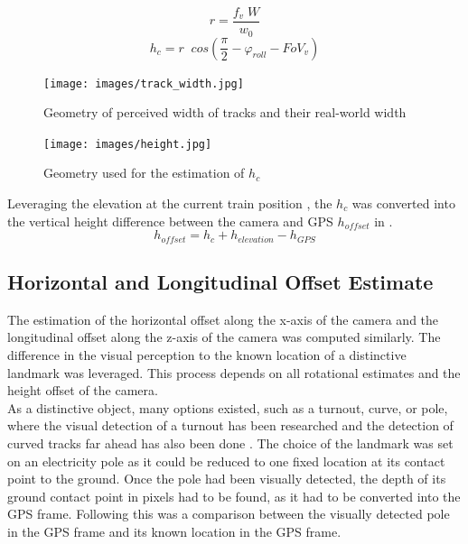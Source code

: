 \begin{equation}
r = \frac{f_v\;  W}{w_0} 
\label{eq:r}
\end{equation}
\begin{equation}
 h_c = r  \; \; cos(\frac{\pi}{2}- \varphi_{roll} - FoV_v)
 \label{eq:h_c}
\end{equation}

\begin{figure}[h!]
   \centering
   \texttt{[image: images/track\_width.jpg]}
   \caption{Geometry of perceived width of tracks and their real-world width}
   \label{pics:width_tracks}
\end{figure}

\begin{figure}[h!]
   \centering
   \texttt{[image: images/height.jpg]}
   \caption{Geometry used for the estimation of $h_{c}$ \citep{ross2010vision}}
   \label{pics:y_pos}
\end{figure}

Leveraging the elevation at the current train position \citep{digitales}, the $h_c$ was converted into the vertical height difference between the camera and GPS $h_{offset}$ in .\\
\begin{equation}
h_{offset} = h_c + h_{elevation} - h_{GPS}
\label{eq:y_pos}
\end{equation}
\newpage


\subsection{Horizontal and Longitudinal Offset Estimate}
The estimation of the horizontal offset along the x-axis of the camera and the longitudinal offset along the z-axis of the camera was computed similarly. The difference in the visual perception to the known location of a distinctive landmark was leveraged. This process depends on all rotational estimates and the height offset of the camera.\\

As a distinctive object, many options existed, such as a turnout, curve, or pole, where the visual detection of a turnout has been researched \citep{qi2013efficient} \citep{ross2010vision} \citep{ross2012track} and the detection of curved tracks far ahead has also been done \citep{nassu2011rail}. The choice of the landmark was set on an electricity pole as it could be reduced to one fixed location at its contact point to the ground. Once the pole had been visually detected, the depth of its ground contact point in pixels had to be found, as it had to be converted into the GPS frame. Following this was a comparison between the visually detected pole in the GPS frame and its known location in the GPS frame.

